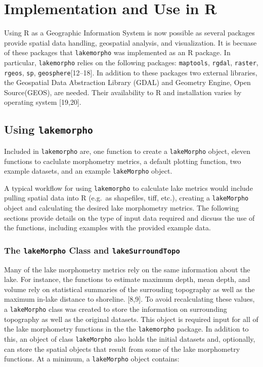 \documentclass[11pt,]{article}
\begin{document}
\section{Implementation and Use in R}\label{implementation-and-use-in-r}

Using R as a Geographic Information System is now possible as several
packages provide spatial data handling, geospatial analysis, and
visualization. It is becuase of these packages that \texttt{lakemorpho}
was implemented as an R package. In particular, \texttt{lakemorpho}
relies on the following packages: \texttt{maptools}, \texttt{rgdal},
\texttt{raster}, \texttt{rgeos}, \texttt{sp},
\texttt{geosphere}{[}12--18{]}. In addition to these packages two
external libraries, the Geospatial Data Abstraction Library (GDAL) and
Geometry Engine, Open Source(GEOS), are needed. Their availability to R
and installation varies by operating system {[}19,20{]}.

\subsection{\texorpdfstring{Using
\texttt{lakemorpho}}{Using lakemorpho}}\label{using-lakemorpho}

Included in \texttt{lakemorpho} are, one function to create a
\texttt{lakeMorpho} object, eleven functions to caclulate morphometry
metrics, a default plotting function, two example datasets, and an
example \texttt{lakeMorpho} object.

A typical workflow for using \texttt{lakemorpho} to calculate lake
metrics would include pulling spatial data into R (e.g.~as shapefiles,
tiff, etc.), creating a \texttt{lakeMorpho} object and calculating the
desired lake morphometry metrics. The following sections provide details
on the type of input data required and dicsuss the use of the functions,
including examples with the provided example data.

\subsubsection{\texorpdfstring{The \texttt{lakeMorpho} Class and
\texttt{lakeSurroundTopo}}{The lakeMorpho Class and lakeSurroundTopo}}\label{the-lakemorpho-class-and-lakesurroundtopo}

Many of the lake morphometry metrics rely on the same information about
the lake. For instance, the functions to estimate maximum depth, mean
depth, and volume rely on statistical summaries of the surrouding
topography as well as the maximum in-lake distance to shoreline.
{[}8,9{]}. To avoid recalculating these values, a \texttt{lakeMorpho}
class was created to store the information on surrounding topography as
well as the original datasets. This object is required input for all of
the lake morphometry functions in the the \texttt{lakemorpho} package.
In addition to this, an object of class \texttt{lakeMorpho} also holds
the initial datasets and, optionally, can store the spatial objects that
result from some of the lake morphometry functions. At a minimum, a
\texttt{lakeMorpho} object contains:
\end{document}
